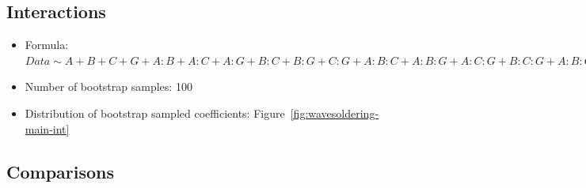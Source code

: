\documentclass{article}
\begin{document}
\subsection{Interactions}
\begin{itemize}
    \item Formula: $Data \sim A + B + C + G + A:B + A:C + A:G + B:C + B:G + C:G + A:B:C + A:B:G + A:C:G + B:C:G + A:B:C:G$
    \item Number of bootstrap samples: 100
    \item Distribution of bootstrap sampled coefficients: Figure~\ref{fig:wavesoldering-main-int}
\end{itemize}

\subsection{Comparisons}







\clearpage
\end{document}
